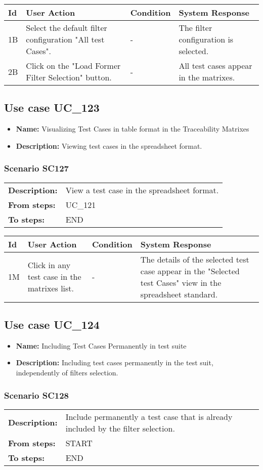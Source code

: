 \documentclass[a4paper,11pt]{article}
\newcommand{\bl}{\\ \hline}
\begin{document}
\begin{tabular}{|p{0.8in}|p{1.6in}|p{1.6in}|p{1.6in}|}
\hline
Id & User Action & Condition & System Response  \bl 
1B & Select the default filter configuration "All test Cases".
					 & - & The filter configuration is selected. \bl 
2B & Click on the "Load Former Filter Selection" button.
					 & - & All test cases appear in the matrixes. \bl 
\end{tabular}
\subsection*{Use case UC_123}
\begin{itemize}
\item {\bf Name: }Visualizing Test Cases in table format in the Traceability
				Matrixes
\item {\bf Description: }Viewing test cases in the spreadsheet format.
			
\end{itemize}
\subsubsection*{Scenario SC127}
\begin{tabular}{p{1in}p{4in}}
{\bf Description:} & View a test case in the spreadsheet format.
				 \\
{\bf From steps:} & UC_121#2M \\
{\bf To steps:} & END \\
\end{tabular}
 
\begin{tabular}{|p{0.8in}|p{1.6in}|p{1.6in}|p{1.6in}|}
\hline
Id & User Action & Condition & System Response  \bl 
1M & Click in any test case in the matrixes list. & - & The details of the selected test case appear in the
						"Selected test Cases" view in the spreadsheet standard. \bl 
\end{tabular}
\subsection*{Use case UC_124}
\begin{itemize}
\item {\bf Name: }Including Test Cases Permanently in test suite
\item {\bf Description: }Including test cases permanently in the test suit,
				independently of filters selection.
\end{itemize}
\subsubsection*{Scenario SC128}
\begin{tabular}{p{1in}p{4in}}
{\bf Description:} & Include permanently a test case that is already
					included by the filter selection. \\
{\bf From steps:} & START \\
{\bf To steps:} & END \\
\end{tabular}
 
\end{document}
